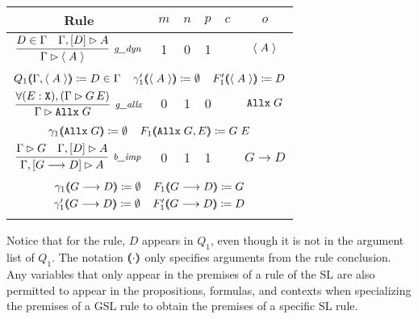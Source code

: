 \noindent
\begin{tabular}{c c c c c c}
\\
\hline
Rule & $m$ & $n$ & $p$ & $c$ & $o$ \\
\hline \hline \noalign{\smallskip}
$\vcenter{\rlsinit{}}$ & 1 & 0 & 1 & \dyncon{} & $\langle \; A \; \rangle$ \\
\noalign{\smallskip} \hline \noalign{\smallskip}
\multicolumn{6}{c}{$t_1 \coloneqq 0$} \\
\multicolumn{6}{c}{$Q_1 \args{\dyncon{} , \atom{A}} \coloneqq D \in \dyncon{} \;\;\;\; \gamma'_1 \args{\atom{A}} \coloneqq \emptyset \;\;\;\; F'_1 \args{\atom{A}} \coloneqq D$} \\
\noalign{\smallskip} \hline \hline \noalign{\smallskip}

$\vcenter{\rlsalls{}}$ & 0 & 1 & 0 & \dyncon{} & $\texttt{Allx} \; G$ \\
\noalign{\smallskip} \hline \noalign{\smallskip}
\multicolumn{6}{c}{$s_1 \coloneqq 1 \;\;\;\; x_{1,1} \coloneqq E \;\;\;\; R_{1,1} \coloneqq \sltm{X}$} \\
\multicolumn{6}{c}{$\gamma_1 (\hspace{-0.35em} \langle \texttt{Allx} \; G \rangle \hspace{-0.35em}) \coloneqq \emptyset \;\;\;\; F_1 (\hspace{-0.35em} \langle \texttt{Allx} \; G , E \rangle \hspace{-0.35em}) \coloneqq G \; E$} \\
\noalign{\smallskip} \hline \hline \noalign{\smallskip}

$\vcenter{\rlbimp{}}$ & 0 & 1 & 1 & \dyncon{} & $G \longrightarrow D$ \\
\noalign{\smallskip} \hline
\multicolumn{6}{c}{$s_1 \coloneqq 0 \;\;\;\; t_1 \coloneqq 0$} \\
\multicolumn{6}{c}{$\gamma_1 (\hspace{-0.35em} \langle G \longrightarrow D \rangle \hspace{-0.35em}) \coloneqq \emptyset \;\;\;\; F_1 (\hspace{-0.35em} \langle G \longrightarrow D \rangle \hspace{-0.35em}) \coloneqq G$} \\
\multicolumn{6}{c}{$\gamma'_1 (\hspace{-0.35em} \langle G \longrightarrow D \rangle \hspace{-0.35em}) \coloneqq \emptyset \;\;\;\; F'_1 (\hspace{-0.35em} \langle G \longrightarrow D \rangle \hspace{-0.35em}) \coloneqq D$} \\
\hline
\\
\end{tabular}

\noindent
Notice that for the \rlnmsinit{} rule, $D$ appears in $Q_1$, even
though it is not in the argument list of $Q_1$.  The notation
$(\hspace{-0.35em} \langle \cdot \rangle \hspace{-0.35em})$ only specifies arguments from the rule conclusion.  Any
variables that only appear in the premises of a rule of the SL are
also permitted to appear in the propositions, formulas, and contexts
when specializing the premises of a GSL rule to obtain the premises of
a specific SL rule.


